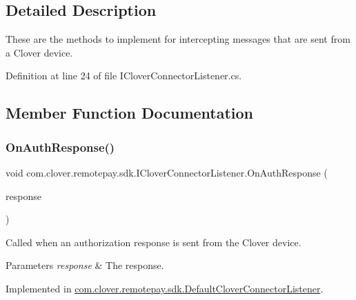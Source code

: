 \subsection{Detailed Description}
These are the methods to implement for intercepting messages that are sent from a Clover device. 



Definition at line 24 of file I\+Clover\+Connector\+Listener.\+cs.



\subsection{Member Function Documentation}
\mbox{\label{interfacecom_1_1clover_1_1remotepay_1_1sdk_1_1_i_clover_connector_listener_a113c61abe6e951817d23bc1561fcb22d}} 
\subsubsection{\texorpdfstring{On\+Auth\+Response()}{OnAuthResponse()}}
{\footnotesize\ttfamily void com.\+clover.\+remotepay.\+sdk.\+I\+Clover\+Connector\+Listener.\+On\+Auth\+Response (\begin{DoxyParamCaption}\item[{\hyperlink{classcom_1_1clover_1_1remotepay_1_1sdk_1_1_auth_response}{Auth\+Response}}]{response }\end{DoxyParamCaption})}



Called when an authorization response is sent from the Clover device. 


\begin{DoxyParams}{Parameters}
{\em response} & The response.\\
\hline
\end{DoxyParams}


Implemented in \hyperlink{classcom_1_1clover_1_1remotepay_1_1sdk_1_1_default_clover_connector_listener_afbe9b03563cc7129384a094eae1adbe5}{com.\+clover.\+remotepay.\+sdk.\+Default\+Clover\+Connector\+Listener}.

